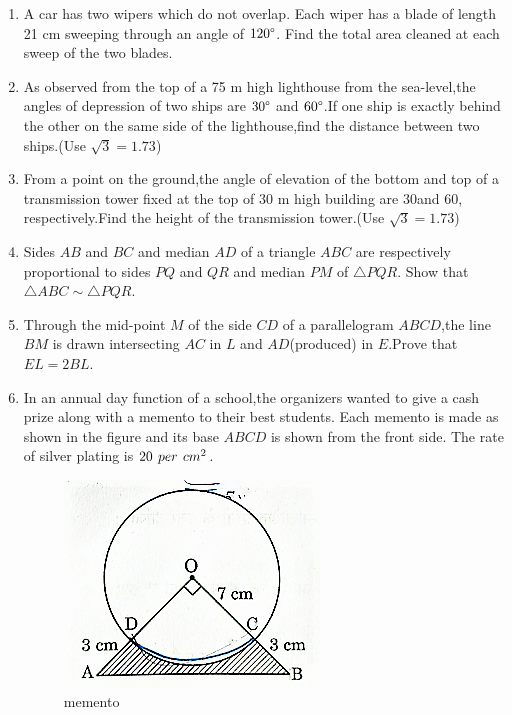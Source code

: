 \documentclass{article}
\begin{document}
\begin{enumerate}
\item  A car has two wipers which do not overlap. Each wiper has a blade of length 21 cm sweeping through an angle of $120\degree$. Find the total area cleaned at each sweep of the two blades.

\item  As observed from the top of a 75 m high lighthouse from the sea-level,the angles of depression of two ships are $30\degree$ and $60\degree$.If one ship is exactly behind the other on the same side of the lighthouse,find the distance between two ships.(Use $\sqrt{3} = 1.73$)

\item  From a point on the ground,the angle of elevation of the bottom and top of a transmission tower fixed at the top of 30 m high building are 30\degree and 60\degree, respectively.Find the height of the transmission tower.(Use $\sqrt{3} = 1.73$)
    
\item Sides $AB$ and $BC$ and median $AD$ of a triangle $ABC$ are respectively proportional to sides $PQ$ and $QR$ and median $PM$ of $\triangle PQR$. Show that $\triangle ABC \sim \triangle PQR$. 

\item  Through the mid-point $M$ of the side $CD$ of a parallelogram $ABCD$,the line $BM$ is drawn intersecting $AC$ in $L$ and $AD$(produced) in $E$.Prove that $EL=2BL$.

\item  In an annual day function of a school,the organizers wanted to give a cash prize along with a memento to their best students. Each memento is made as shown in  the figure and its base $ABCD$ is shown from the front side. The rate of silver plating is \rupee \hspace{4 pt}$20 \hspace{4 pt} per \hspace{ 4 pt}  cm^2$.

\begin{figure}[h]
    \centering
    \includegraphics[width=0.5\columnwidth]{figs/30_2_1_Q36.png}
    \caption{memento}
    \label{fig:30_2_1_Q36}
\end{figure}


\end{enumerate}
\end{document}
